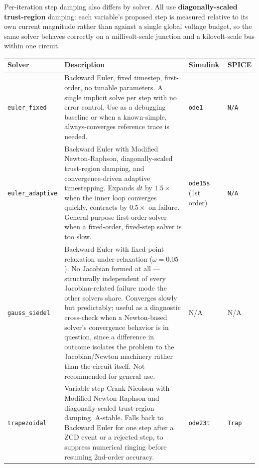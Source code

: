 \documentclass[11pt, a4paper]{article}
\newcommand{\code}[1]{\texttt{\small #1}}
\begin{document}
Per-iteration step damping also differs by solver. All use
\textbf{diagonally-scaled trust-region} damping: each variable's proposed
step is measured relative to its own current magnitude rather than against
a single global voltage budget, so the same solver behaves correctly on a
millivolt-scale junction and a kilovolt-scale bus within one circuit.

\begin{center}
\renewcommand{\arraystretch}{1.5}
\begin{tabular}{@{} L{3.5cm} L{6.8cm} L{2.2cm} L{2cm} @{}}
\toprule
\textbf{Solver} & \textbf{Description} & \textbf{Simulink} & \textbf{SPICE} \\
\midrule
\code{euler\_fixed}
& Backward Euler, fixed timestep, first-order, no tunable parameters.
      A single implicit solve per step with no error control. Use as a
      debugging baseline or when a known-simple, always-converges
      reference trace is needed.
& \code{ode1}
& \code{N/A} \\
\code{euler\_adaptive}
& Backward Euler with Modified Newton-Raphson, diagonally-scaled
      trust-region damping, and convergence-driven adaptive timestepping.
      Expands $dt$ by $1.5\times$ when the inner loop converges quickly,
      contracts by $0.5\times$ on failure. General-purpose first-order
      solver when a fixed-order, fixed-step solver is too slow.
& \code{ode15s} (1st order)
& \code{N/A} \\
\code{gauss\_siedel}
& Backward Euler with fixed-point relaxation under-relaxation
      ($\omega = 0.05$). No Jacobian formed at all --- structurally
      independent of every Jacobian-related failure mode the other
      solvers share. Converges slowly but predictably; useful as a
      diagnostic cross-check when a Newton-based solver's convergence
      behavior is in question, since a difference in outcome isolates
      the problem to the Jacobian/Newton machinery rather than the
      circuit itself. Not recommended for general use.
& N/A
& N/A \\
\code{trapezoidal}
& Variable-step Crank-Nicolson with Modified Newton-Raphson and
      diagonally-scaled trust-region damping. A-stable.
      Falls back to Backward Euler for one step after a ZCD event or a
      rejected step, to suppress numerical ringing before resuming
      2nd-order accuracy.
& \code{ode23t}
& \code{Trap} \\
\bottomrule
\end{tabular}
\end{center}
\newpage
\end{document}

